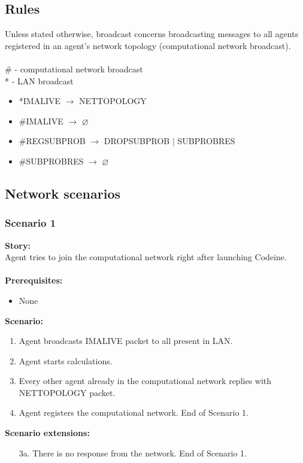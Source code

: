 \documentclass{article}
\begin{document}
\subsection{Rules}
Unless stated otherwise, broadcast concerns broadcasting messages to all agents registered in an agent's network topology (computational network broadcast). \\\\
\# - computational network broadcast\\
* - LAN broadcast
\begin{itemize}
    \item *IMALIVE $\rightarrow$ NETTOPOLOGY
    \item \#{}IMALIVE $\rightarrow$ $\varnothing$
    \item \#{}REGSUBPROB $\rightarrow$ DROPSUBPROB $\vert$ SUBPROBRES
    \item \#{}SUBPROBRES $\rightarrow$ $\varnothing$
\end{itemize}

\subsection{Network scenarios}
\subsubsection{Scenario 1}
\noindent\textbf{Story:} \\
Agent tries to join the computational network right after launching Codeine. \\\\
\textbf{Prerequisites:}
\begin{itemize}
    \item None
\end{itemize}
\textbf{Scenario:}
\begin{enumerate}
    \item Agent broadcasts IMALIVE packet to all present in LAN.
    \item Agent starts calculations.
    \item Every other agent already in the computational network replies with NETTOPOLOGY packet.
    \item Agent registers the computational network. End of Scenario 1.
\end{enumerate}
\textbf{Scenario extensions:}
\begin{itemize}
    \item[3a.] There is no response from the network. End of Scenario 1.
\end{itemize}
\end{document}

